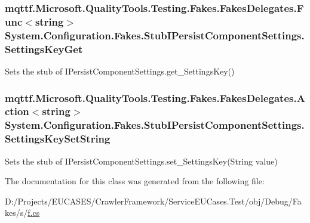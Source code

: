 \hypertarget{class_system_1_1_configuration_1_1_fakes_1_1_stub_i_persist_component_settings_acc23c0ce52c99ce896d7e174e93e2e7c}{
\subsubsection[{Settings\-Key\-Get}]{\setlength{\rightskip}{0pt plus 5cm}mqttf.\-Microsoft.\-Quality\-Tools.\-Testing.\-Fakes.\-Fakes\-Delegates.\-Func$<$string$>$ System.\-Configuration.\-Fakes.\-Stub\-I\-Persist\-Component\-Settings.\-Settings\-Key\-Get}}\label{class_system_1_1_configuration_1_1_fakes_1_1_stub_i_persist_component_settings_acc23c0ce52c99ce896d7e174e93e2e7c}


Sets the stub of I\-Persist\-Component\-Settings.\-get\-\_\-\-Settings\-Key()

\hypertarget{class_system_1_1_configuration_1_1_fakes_1_1_stub_i_persist_component_settings_a7b4b476e259ac7eb200924f971ec6455}{
\subsubsection[{Settings\-Key\-Set\-String}]{\setlength{\rightskip}{0pt plus 5cm}mqttf.\-Microsoft.\-Quality\-Tools.\-Testing.\-Fakes.\-Fakes\-Delegates.\-Action$<$string$>$ System.\-Configuration.\-Fakes.\-Stub\-I\-Persist\-Component\-Settings.\-Settings\-Key\-Set\-String}}\label{class_system_1_1_configuration_1_1_fakes_1_1_stub_i_persist_component_settings_a7b4b476e259ac7eb200924f971ec6455}


Sets the stub of I\-Persist\-Component\-Settings.\-set\-\_\-\-Settings\-Key(\-String value)



The documentation for this class was generated from the following file\-:\begin{DoxyCompactItemize}
\item 
D\-:/\-Projects/\-E\-U\-C\-A\-S\-E\-S/\-Crawler\-Framework/\-Service\-E\-U\-Cases.\-Test/obj/\-Debug/\-Fakes/s/\hyperlink{s_2f_8cs}{f.\-cs}\end{DoxyCompactItemize}
